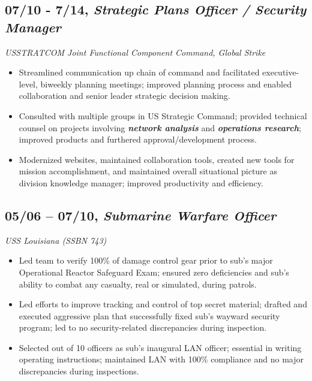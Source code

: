 \documentclass[10pt]{article}
\def\tightlist{}
\begin{document}
\hypertarget{strategic-plans-officer-security-manager}{%
\subsection{\texorpdfstring{07/10 - 7/14, \textbf{\emph{Strategic Plans
Officer / Security
Manager}}}{07/10 - 7/14, Strategic Plans Officer / Security Manager}}\label{strategic-plans-officer-security-manager}}

\emph{USSTRATCOM Joint Functional Component Command, Global Strike}

\begin{itemize}
\tightlist
\item
  Streamlined communication up chain of command and facilitated
  executive-level, biweekly planning meetings; improved planning process
  and enabled collaboration and senior leader strategic decision making.
\item
  Consulted with multiple groups in US Strategic Command; provided
  technical counsel on projects involving \textbf{\emph{network
  analysis}} and \textbf{\emph{operations research}}; improved products
  and furthered approval/development process.
\item
  Modernized websites, maintained collaboration tools, created new tools
  for mission accomplishment, and maintained overall situational picture
  as division knowledge manager; improved productivity and efficiency.
\end{itemize}

\hypertarget{submarine-warfare-officer}{%
\subsection{\texorpdfstring{05/06 -- 07/10, \textbf{\emph{Submarine
Warfare
Officer}}}{05/06 -- 07/10, Submarine Warfare Officer}}\label{submarine-warfare-officer}}

\emph{USS Louisiana (SSBN 743)}

\begin{itemize}
\tightlist
\item
  Led team to verify 100\% of damage control gear prior to sub's major
  Operational Reactor Safeguard Exam; ensured zero deficiencies and
  sub's ability to combat any casualty, real or simulated, during
  patrols.
\item
  Led efforts to improve tracking and control of top secret material;
  drafted and executed aggressive plan that successfully fixed sub's
  wayward security program; led to no security-related discrepancies
  during inspection.
\item
  Selected out of 10 officers as sub's inaugural LAN officer; essential
  in writing operating instructions; maintained LAN with 100\%
  compliance and no major discrepancies during inspections.
\end{itemize}
\end{document}
